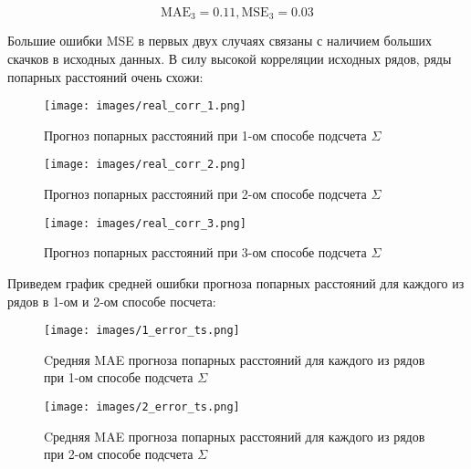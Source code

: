 \documentclass{article}
\begin{document}
\begin{equation}
    \text{MAE}_3 = 0.11, \text{MSE}_3 = 0.03
\end{equation}

Большие ошибки MSE в первых двух случаях связаны с наличием больших скачков в исходных данных. В силу высокой корреляции исходных рядов, ряды попарных расстояний очень схожи:

\newpage

\begin{figure}[h]
  \begin{minipage}{0.5\textwidth}
    \centering
    \texttt{[image: images/real\_corr\_1.png]}
    \caption{Прогноз попарных расстояний при 1-ом способе подсчета $\Sigma$}
  \end{minipage}\hfill
  \begin{minipage}{0.5\textwidth}
    \centering
    \texttt{[image: images/real\_corr\_2.png]}
    \caption{Прогноз попарных расстояний при 2-ом способе подсчета $\Sigma$}
  \end{minipage}
\end{figure}

\begin{figure}[h]
  \centering
  \begin{minipage}{0.5\textwidth}
    \centering
    \texttt{[image: images/real\_corr\_3.png]}
    \caption{Прогноз попарных расстояний при 3-ом способе подсчета $\Sigma$}
  \end{minipage}\hfill
\end{figure}

Приведем график средней ошибки прогноза попарных расстояний для каждого из рядов в 1-ом и 2-ом способе посчета:

\newpage

\begin{figure}[h]
  \begin{minipage}{0.5\textwidth}
    \centering
    \texttt{[image: images/1\_error\_ts.png]}
    \caption{Cредняя MAE прогноза попарных расстояний для каждого из рядов при 1-ом способе подсчета $\Sigma$}
  \end{minipage}\hfill
  \begin{minipage}{0.5\textwidth}
    \centering
    \texttt{[image: images/2\_error\_ts.png]}
    \caption{Cредняя MAE прогноза попарных расстояний для каждого из рядов при 2-ом способе подсчета $\Sigma$}
  \end{minipage}
\end{figure}
\end{document}
